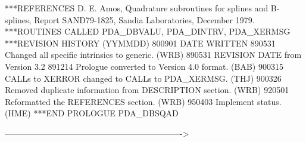 \documentclass[11pt,twoside,nolof]{starlink}
\begin{document}
\begin{terminalv}
***REFERENCES  D. E. Amos, Quadrature subroutines for splines and
                 B-splines, Report SAND79-1825, Sandia Laboratories,
                 December 1979.
***ROUTINES CALLED  PDA_DBVALU, PDA_DINTRV, PDA_XERMSG
***REVISION HISTORY  (YYMMDD)
   800901  DATE WRITTEN
   890531  Changed all specific intrinsics to generic.  (WRB)
   890531  REVISION DATE from Version 3.2
   891214  Prologue converted to Version 4.0 format.  (BAB)
   900315  CALLs to XERROR changed to CALLs to PDA_XERMSG.  (THJ)
   900326  Removed duplicate information from DESCRIPTION section.
           (WRB)
   920501  Reformatted the REFERENCES section.  (WRB)
   950403  Implement status.  (HME)
***END PROLOGUE  PDA_DBSQAD
\end{terminalv}

    ---------------------------------------------------------------->

\end{document}
